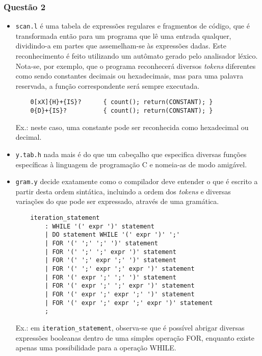 \documentclass{article}
\begin{document}
\subsubsection*{Questão 2}
\begin{itemize}
    \item \texttt{scan.l} é uma tabela de expressões regulares e fragmentos de
    código, que é transformada então para um programa que lê uma entrada
    qualquer, dividindo-a em partes que assemelham-se às expressões dadas. Este
    reconhecimento é feito utilizando um autômato gerado pelo analisador léxico.
    Nota-se, por exemplo, que o programa reconhecerá diversos \textit{tokens}
    diferentes como sendo constantes decimais ou hexadecimais, mas para uma
    palavra reservada, a função correspondente será sempre executada.

    \begin{verbatim}
    0[xX]{H}+{IS}?      { count(); return(CONSTANT); }
    0{D}+{IS}?          { count(); return(CONSTANT); }    \end{verbatim}

    Ex.: neste caso, uma constante pode ser reconhecida como hexadecimal ou
    decimal.

    \item \texttt{y.tab.h} nada mais é do que um cabeçalho que especifica
    diversas funções específicas à linguagem de programação C e nomeia-as de
    modo amigável.

    \item \texttt{gram.y} decide exatamente como o compilador deve entender o
    que é escrito a partir desta ordem sintática, incluindo a ordem dos
    \textit{tokens} e diversas variações do que pode ser expressado, através de
    uma gramática.

    \begin{verbatim}
    iteration_statement
        : WHILE '(' expr ')' statement
        | DO statement WHILE '(' expr ')' ';'
        | FOR '(' ';' ';' ')' statement
        | FOR '(' ';' ';' expr ')' statement
        | FOR '(' ';' expr ';' ')' statement
        | FOR '(' ';' expr ';' expr ')' statement
        | FOR '(' expr ';' ';' ')' statement
        | FOR '(' expr ';' ';' expr ')' statement
        | FOR '(' expr ';' expr ';' ')' statement
        | FOR '(' expr ';' expr ';' expr ')' statement
        ; \end{verbatim}

    Ex.: em \texttt{iteration\_statement}, observa-se que é possível abrigar
    diversas expressões booleanas dentro de uma simples operação FOR, enquanto
    existe apenas uma possibilidade para a operação WHILE.
\end{itemize}
\end{document}
